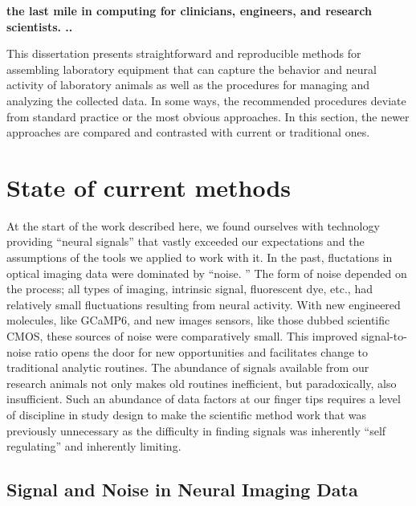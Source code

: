 \documentclass[../main.tex]{subfiles}
\begin{document}
\thispagestyle{myheadings}

\textbf{the last mile in computing for clinicians, engineers, and research scientists.
	..}

This dissertation presents straightforward and reproducible methods for assembling laboratory equipment that can capture the behavior and neural activity of laboratory animals as well as the procedures for managing and analyzing the collected data.
In some ways, the recommended procedures deviate from standard practice or the most obvious approaches.
In this section, the newer approaches are compared and contrasted with current or traditional ones.

\section{
  State of current methods}\label{state-of-current-methods}

At the start of the work described here, we found ourselves with technology providing “neural signals” that vastly exceeded our expectations and the assumptions of the tools we applied to work with it.
In the past, fluctations in optical imaging data were dominated by “noise.
” The form of noise depended on the process; all types of imaging, intrinsic signal, fluorescent dye, etc., had relatively small fluctuations resulting from neural activity.
With new engineered molecules, like GCaMP6, and new images sensors, like those dubbed scientific CMOS, these sources of noise were comparatively small.
This improved signal-to-noise ratio opens the door for new opportunities and facilitates change to traditional analytic routines.
The abundance of signals available from our research animals not only makes old routines inefficient, but paradoxically, also insufficient.
Such an abundance of data factors at our finger tips requires a level of discipline in study design to make the scientific method work that was previously unnecessary as the difficulty in finding signals was inherently “self regulating” and inherently limiting.

\subsection{
	Signal and Noise in Neural Imaging Data}\label{signal-and-noise-in-neural-imaging-data}
\end{document}
